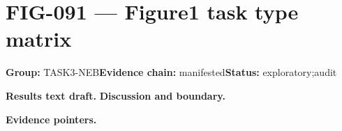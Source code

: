 \clearpage
\section{FIG-091 --- Figure1 task type matrix}
\label{figpage:fig-091}
\textbf{Group:} TASK3-NEB\quad \textbf{Evidence chain:} manifested\quad \textbf{Status:} exploratory;audit

\textbf{Results text draft.} 
\textbf{Discussion and boundary.} 


\textbf{Evidence pointers.}



\vfill
